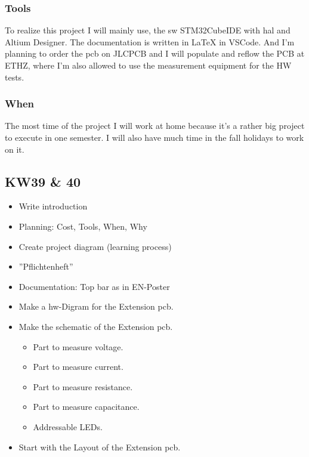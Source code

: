 \subsubsection{Tools}
To realize this project I will mainly use, the \acs{sw} STM32CubeIDE with \acs{hal} and Altium Designer. The documentation is written in LaTeX in VSCode. And I'm planning to order the \acs{pcb} on JLCPCB and I will populate and reflow the PCB at ETHZ, where I'm also allowed to use the measurement equipment for the HW tests.

\subsubsection{When}
The most time of the project I will work at home because it's a rather big project to execute in one semester. I will also have much time in the fall holidays to work on it.


\subsection{KW39 \& 40}
\begin{itemize}
    \item Write introduction
    \item Planning: Cost, Tools, When, Why
    \item Create project diagram (learning process)
    \item ''Pflichtenheft''
    \item Documentation: Top bar as in EN-Poster
    \item Make a \acs{hw}-Digram for the Extension \acs{pcb}.
    \item Make the schematic of the Extension \acs{pcb}. 
    \begin{itemize}
        \item Part to measure voltage.
        \item Part to measure current.
        \item Part to measure resistance.
        \item Part to measure capacitance.
        \item Addressable LEDs.
    \end{itemize}
    \item Start with the Layout of the Extension \acs{pcb}.
\end{itemize}
\newpage